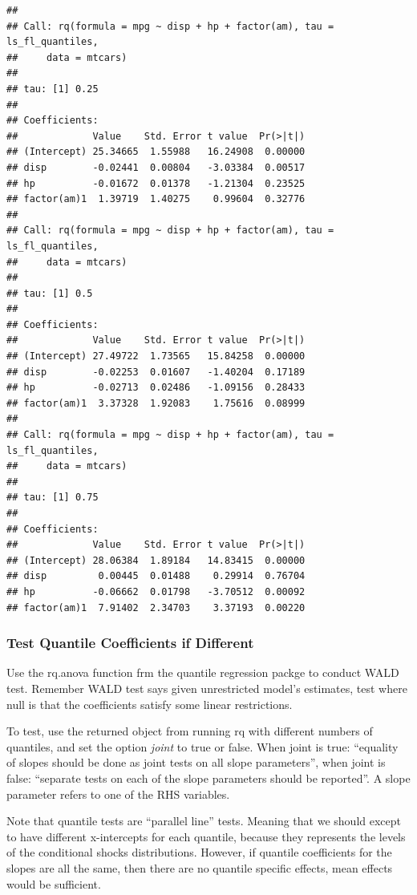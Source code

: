 \documentclass[
]{book}
\begin{document}
\begin{verbatim}
## 
## Call: rq(formula = mpg ~ disp + hp + factor(am), tau = ls_fl_quantiles, 
##     data = mtcars)
## 
## tau: [1] 0.25
## 
## Coefficients:
##             Value    Std. Error t value  Pr(>|t|)
## (Intercept) 25.34665  1.55988   16.24908  0.00000
## disp        -0.02441  0.00804   -3.03384  0.00517
## hp          -0.01672  0.01378   -1.21304  0.23525
## factor(am)1  1.39719  1.40275    0.99604  0.32776
## 
## Call: rq(formula = mpg ~ disp + hp + factor(am), tau = ls_fl_quantiles, 
##     data = mtcars)
## 
## tau: [1] 0.5
## 
## Coefficients:
##             Value    Std. Error t value  Pr(>|t|)
## (Intercept) 27.49722  1.73565   15.84258  0.00000
## disp        -0.02253  0.01607   -1.40204  0.17189
## hp          -0.02713  0.02486   -1.09156  0.28433
## factor(am)1  3.37328  1.92083    1.75616  0.08999
## 
## Call: rq(formula = mpg ~ disp + hp + factor(am), tau = ls_fl_quantiles, 
##     data = mtcars)
## 
## tau: [1] 0.75
## 
## Coefficients:
##             Value    Std. Error t value  Pr(>|t|)
## (Intercept) 28.06384  1.89184   14.83415  0.00000
## disp         0.00445  0.01488    0.29914  0.76704
## hp          -0.06662  0.01798   -3.70512  0.00092
## factor(am)1  7.91402  2.34703    3.37193  0.00220
\end{verbatim}

\hypertarget{test-quantile-coefficients-if-different}{%
\subsubsection{Test Quantile Coefficients if Different}\label{test-quantile-coefficients-if-different}}

Use the rq.anova function frm the quantile regression packge to conduct WALD test. Remember WALD test says given unrestricted model's estimates, test where null is that the coefficients satisfy some linear restrictions.

To test, use the returned object from running rq with different numbers of quantiles, and set the option \emph{joint} to true or false. When joint is true: ``equality of slopes should be done as joint tests on all slope parameters'', when joint is false: ``separate tests on each of the slope parameters should be reported''. A slope parameter refers to one of the RHS variables.

Note that quantile tests are ``parallel line'' tests. Meaning that we should except to have different x-intercepts for each quantile, because they represents the levels of the conditional shocks distributions. However, if quantile coefficients for the slopes are all the same, then there are no quantile specific effects, mean effects would be sufficient.
\end{document}

